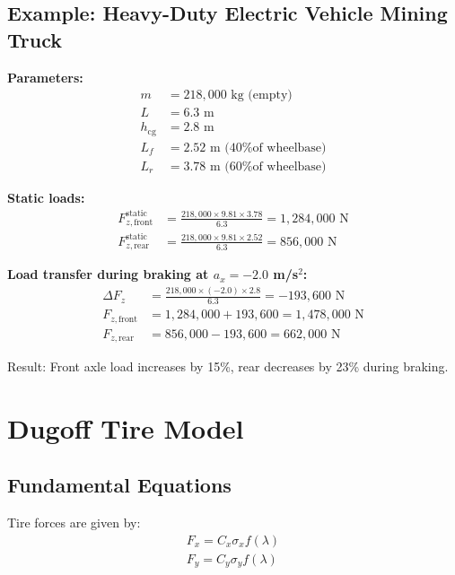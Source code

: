 \documentclass[11pt,a4paper]{article}
\begin{document}
\subsection{Example: Heavy-Duty Electric Vehicle Mining Truck}

\textbf{Parameters:}
\begin{align}
m &= 218{,}000 \text{ kg (empty)} \\
L &= 6.3 \text{ m} \\
h_{\text{cg}} &= 2.8 \text{ m} \\
L_f &= 2.52 \text{ m (40\% of wheelbase)} \\
L_r &= 3.78 \text{ m (60\% of wheelbase)}
\end{align}

\textbf{Static loads:}
\begin{align}
F_{z,\text{front}}^{\text{static}} &= \frac{218{,}000 \times 9.81 \times 3.78}{6.3} = 1{,}284{,}000 \text{ N} \\
F_{z,\text{rear}}^{\text{static}} &= \frac{218{,}000 \times 9.81 \times 2.52}{6.3} = 856{,}000 \text{ N}
\end{align}

\textbf{Load transfer during braking at $a_x = -2.0$ m/s$^2$:}
\begin{align}
\Delta F_z &= \frac{218{,}000 \times (-2.0) \times 2.8}{6.3} = -193{,}600 \text{ N} \\
F_{z,\text{front}} &= 1{,}284{,}000 + 193{,}600 = 1{,}478{,}000 \text{ N} \\
F_{z,\text{rear}} &= 856{,}000 - 193{,}600 = 662{,}000 \text{ N}
\end{align}

Result: Front axle load increases by 15\%, rear decreases by 23\% during braking.

\section{Dugoff Tire Model}
\label{sec:dugoff}

\subsection{Fundamental Equations}

Tire forces are given by:
\begin{align}
\boxed{F_x = C_x \sigma_x f(\lambda)} \label{eq:Fx_dugoff}\\
\boxed{F_y = C_y \sigma_y f(\lambda)} \label{eq:Fy_dugoff}
\end{align}
\end{document}
